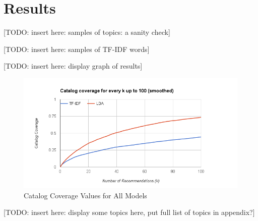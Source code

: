 \chapter{Results} \label{chp:chapter3}

[TODO: insert here: samples of topics: a sanity check]

[TODO: insert here: samples of TF-IDF words]

[TODO: insert here: display graph of results]

\begin{figure}[hhhhhtb]
	\centering
		\includegraphics[width=5.5in,natwidth=510,natheight=642]{figures/catalog_coverage_0_100.png}
		\caption[Catalog Coverage Values for All Models]{
			Catalog Coverage Values for All Models
		}
	\label{fig:catalog_coverage_0_100}
\end{figure}

[TODO: insert here: display some topics here, put full list of topics in appendix?]
